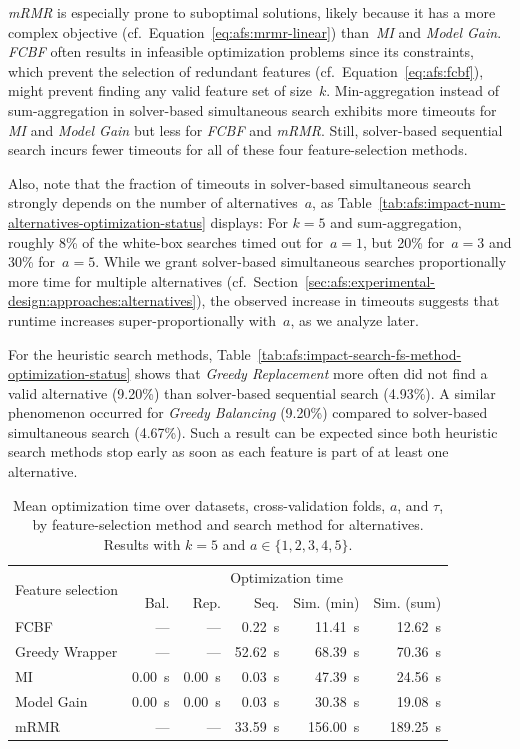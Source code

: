 \documentclass{article}
\theoremstyle{definition}
\begin{document}
\emph{mRMR} is especially prone to suboptimal solutions, likely because it has a more complex objective (cf.~Equation~\ref{eq:afs:mrmr-linear}) than~\emph{MI} and \emph{Model Gain}.
\emph{FCBF} often results in infeasible optimization problems since its constraints, which prevent the selection of redundant features (cf.~Equation~\ref{eq:afs:fcbf}), might prevent finding any valid feature set of size~$k$.
Min-aggregation instead of sum-aggregation in solver-based simultaneous search exhibits more timeouts for \emph{MI} and \emph{Model Gain} but less for \emph{FCBF} and \emph{mRMR}.
Still, solver-based sequential search incurs fewer timeouts for all of these four feature-selection methods.

Also, note that the fraction of timeouts in solver-based simultaneous search strongly depends on the number of alternatives~$a$, as Table~\ref{tab:afs:impact-num-alternatives-optimization-status} displays:
For $k=5$ and sum-aggregation, roughly 8\% of the white-box searches timed out for~$a=1$, but 20\% for~$a=3$ and 30\% for~$a=5$.
While we grant solver-based simultaneous searches proportionally more time for multiple alternatives (cf.~Section~\ref{sec:afs:experimental-design:approaches:alternatives}), the observed increase in timeouts suggests that runtime increases super-proportionally with~$a$, as we analyze later.

For the heuristic search methods, Table~\ref{tab:afs:impact-search-fs-method-optimization-status} shows that \emph{Greedy Replacement} more often did not find a valid alternative (9.20\%) than solver-based sequential search (4.93\%).
A similar phenomenon occurred for \emph{Greedy Balancing} (9.20\%) compared to solver-based simultaneous search (4.67\%).
Such a result can be expected since both heuristic search methods stop early as soon as each feature is part of at least one alternative.

\begin{table}[t]
	\centering
	\caption{
		Mean optimization time over datasets, cross-validation folds, $a$, and $\tau$, by feature-selection method and search method for alternatives.
		Results with $k=5$ and $a \in \{1,2,3,4,5\}$.
	}
	\begin{tabular}{lrrrrr}
		\toprule
		\multirow{2}{*}{Feature selection} & \multicolumn{5}{c}{Optimization time} \\
		\cmidrule(lr){2-6}
		& Bal. & Rep. & Seq. & Sim. (min) & Sim. (sum) \\
		\midrule
		FCBF & --- & --- & 0.22~s & 11.41~s & 12.62~s \\
		Greedy Wrapper & --- & --- & 52.62~s & 68.39~s & 70.36~s \\
		MI & 0.00~s & 0.00~s & 0.03~s & 47.39~s & 24.56~s \\
		Model Gain & 0.00~s & 0.00~s & 0.03~s & 30.38~s & 19.08~s \\
		mRMR & --- & --- & 33.59~s & 156.00~s & 189.25~s \\
		\bottomrule
	\end{tabular}
	\label{tab:afs:impact-search-fs-method-optimization-time}
\end{table}
\end{document}
